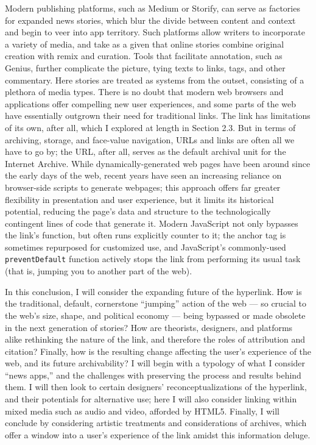 Modern publishing platforms, such as Medium or Storify, can serve as factories for expanded news stories, which blur the divide between content and context and begin to veer into app territory. Such platforms allow writers to incorporate a variety of media, and take as a given that online stories combine original creation with remix and curation. Tools that facilitate annotation, such as Genius, further complicate the picture, tying texts to links, tags, and other commentary. Here stories are treated as systems from the outset, consisting of a plethora of media types. There is no doubt that modern web browsers and applications offer compelling new user experiences, and some parts of the web have essentially outgrown their need for traditional links. The link has limitations of its own, after all, which I explored at length in Section 2.3. But in terms of archiving, storage, and face-value navigation, URLs and links are often all we have to go by; the URL, after all, serves as the default archival unit for the Internet Archive. While dynamically-generated web pages have been around since the early days of the web, recent years have seen an increasing reliance on browser-side scripts to generate webpages; this approach offers far greater flexibility in presentation and user experience, but it limits its historical potential, reducing the page's data and structure to the technologically contingent lines of code that generate it. Modern JavaScript not only bypasses the link's function, but often runs explicitly counter to it; the anchor tag is sometimes repurposed for customized use, and JavaScript's commonly-used \texttt{preventDefault} function actively stops the link from performing its usual task (that is, jumping you to another part of the web).

In this conclusion, I will consider the expanding future of the hyperlink. How is the traditional, default, cornerstone ``jumping'' action of the web --- so crucial to the web's size, shape, and political economy --- being bypassed or made obsolete in the next generation of stories? How are theorists, designers, and platforms alike rethinking the nature of the link, and therefore the roles of attribution and citation? Finally, how is the resulting change affecting the user's experience of the web, and its future archivability? I will begin with a typology of what I consider ``news apps,'' and the challenges with preserving the process and results behind them. I will then look to certain designers' reconceptualizations of the hyperlink, and their potentials for alternative use; here I will also consider linking within mixed media such as audio and video, afforded by HTML5. Finally, I will conclude by considering artistic treatments and considerations of archives, which offer a window into a user's experience of the link amidst this information deluge.

